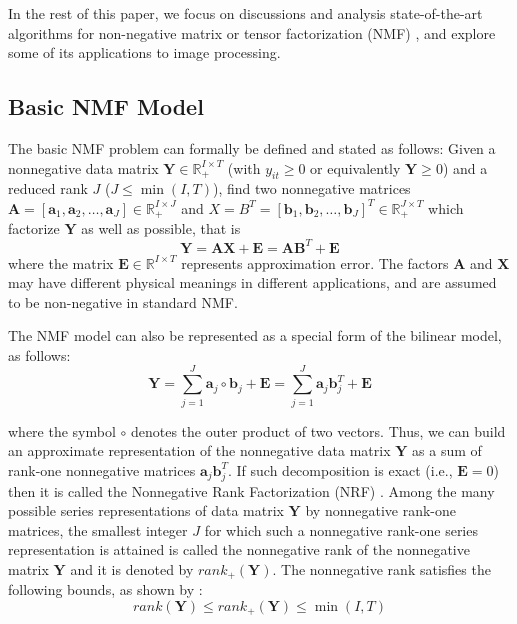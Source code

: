 \documentclass[11pt]{article}
\begin{document}
In the rest of this paper, we focus on discussions and analysis state-of-the-art algorithms for non-negative matrix or tensor factorization (NMF) \cite{113}, and explore some of its applications to image processing.

\subsection{Basic NMF Model}
The basic NMF problem can formally be defined and stated as follows: Given a nonnegative data matrix $\mathbf{Y} \in \mathbb{R}^{I \times T}_{+}$
(with $y_{it} \geq 0$ or equivalently $\mathbf{Y} \geq 0$) and a reduced rank $\mathit{J}$ ($\mathit{J} \leq \min(I, T)$), find two nonnegative matrices $\mathbf{A} = [\mathbf{a}_1, \mathbf{a}_2, \dots , \mathbf{a}_J ] \in \mathbb{R}^{I \times J}_{+}$
and $X = B^T = [\mathbf{b}_1, \mathbf{b}_2, \dots , \mathbf{b}_J]^T
\in \mathbb{R}^{J \times T}_{+}$ which factorize $\mathbf{Y}$ as well as possible, that is
$$\mathbf{Y} = \mathbf{A}\mathbf{X} + \mathbf{E} = \mathbf{A}\mathbf{B}^T + \mathbf{E}$$
where the matrix $\mathbf{E} \in \mathbb{R}^{I \times T}$ represents approximation error. The factors $\mathbf{A}$ and $\mathbf{X}$ may have different physical meanings in different applications, and are assumed to be non-negative in standard NMF.

The NMF model can also be represented as a special form of the bilinear model, as follows:
$$\mathbf{Y} = \sum_{j=1}^J \mathbf{a}_j \circ \mathbf{b}_j + \mathbf{E} = \sum_{j=1}^J \mathbf{a}_j \mathbf{b}_j^T + \mathbf{E}$$

where the symbol $\circ$ denotes the outer product of two vectors. Thus, we can build an approximate representation of the nonnegative data matrix $\mathbf{Y}$ as a sum of rank-one nonnegative matrices $\mathbf{a}_j\mathbf{b}_j^T$. If such decomposition is exact (i.e., $\mathbf{E} = 0$) then it is called the Nonnegative Rank Factorization (NRF) \cite{53}. Among the many possible series representations of data matrix $\mathbf{Y}$ by nonnegative rank-one matrices, the smallest integer $\mathit{J}$ for which such a nonnegative rank-one series representation is attained is called the nonnegative rank of the nonnegative matrix $\mathbf{Y}$ and
it is denoted by $rank_+(\mathbf{Y})$. The nonnegative rank satisfies the following bounds, as shown by \cite{53}:
$$rank(\mathbf{Y}) \leq rank_+(\mathbf{Y}) \leq \min(I, T)$$
\end{document}
